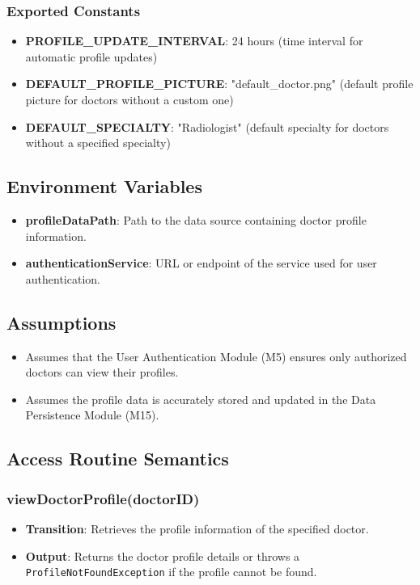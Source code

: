 \documentclass[12pt, titlepage]{article}
\begin{document}
\subsubsection{Exported Constants}
\begin{itemize}
\item \textbf{PROFILE\_UPDATE\_INTERVAL}: 24 hours (time interval for automatic profile updates)
\item \textbf{DEFAULT\_PROFILE\_PICTURE}: "default\_doctor.png" (default profile picture for doctors without a custom one)
\item \textbf{DEFAULT\_SPECIALTY}: "Radiologist" (default specialty for doctors without a specified specialty)
\end{itemize}

\subsection{Environment Variables}
\begin{itemize}
\item \textbf{profileDataPath}: Path to the data source containing doctor profile information.
\item \textbf{authenticationService}: URL or endpoint of the service used for user authentication.
\end{itemize}

\subsection{Assumptions}
\begin{itemize}
\item Assumes that the User Authentication Module (M5) ensures only authorized doctors can view their profiles.
\item Assumes the profile data is accurately stored and updated in the Data Persistence Module (M15).
\end{itemize}

\subsection{Access Routine Semantics}
\subsubsection{viewDoctorProfile(doctorID)}
\begin{itemize}
    \item \textbf{Transition}: Retrieves the profile information of the specified doctor.
    \item \textbf{Output}: Returns the doctor profile details or throws a \texttt{ProfileNotFoundException} if the profile cannot be found.
\end{itemize}
\end{document}
